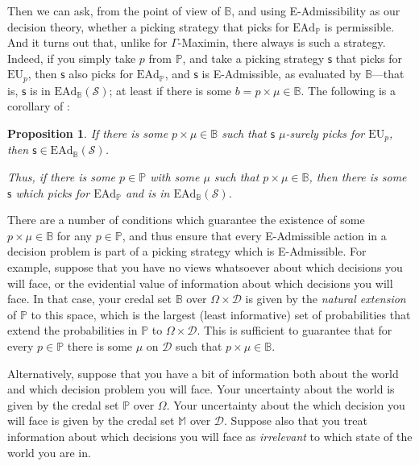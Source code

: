 \documentclass[a4paper]{article}
\newtheorem{proposition}[theorem]{Proposition}
\renewcommand\P{\mathbb{P}} %
\newcommand\EU{\mathrm{EU}}
\newcommand\EAd{\mathrm{EAd}}
\newcommand{\D}{\mathcal{D}}
\renewcommand\S{\mathcal{S}}
\newcommand\s{\mathsf{s}}
\newcommand{\IB}{\mathbb{B}}
\newcommand{\ID}{\mathbb{M}}
\newcommand{\IP}{\P}
\renewcommand{\color}[1]{}
\newenvironment{colored}[1]{\leavevmode\color{#1}}{}
\newcommand{\Strategies}{\S}
\newenvironment{CCM rewritten}
{\begingroup\color{blue}} %
{\endgroup}              %
\begin{document}
\begin{colored}{red}
	

 Then we can ask, from the point of view of $\IB$, and using E-Admissibility as our decision theory, whether a picking strategy that picks for $\EAd_\IP$ is permissible. And it turns out that, unlike for $\Gamma$-Maximin, there always is such a strategy. Indeed, if you simply take $p$ from $\IP$, and take a picking strategy $\s$ that picks for $\EU_p$, then $\s$ also picks for $\EAd_\IP$, and $\s$ is E-Admissible, as evaluated by $\IB$---that is, $\s$ is in $\EAd_\IB(\Strategies)$; at least if there is some $b=p\times\mu\in\IB$. The following is a corollary of :
 \begin{proposition}\label{thm:ead-existence[indep]}
 		If there is some $p\times \mu\in \IB$ such that $\s$ $\mu$-surely picks for $\EU_p$, then $\s\in\EAd_\IB(\Strategies)$. 
 		
 		Thus, if there is some $p\in\IP$ with some $\mu$ such that $p\times\mu\in\IB$, then there is some $\s$ which picks for $\EAd_\IP$ and is in  $\EAd_\IB(\Strategies)$. 
 \end{proposition}
\end{colored}
 
 There are a number of conditions which guarantee the existence of some $p\times\mu\in\IB$ for any $p\in\IP$, and thus ensure that every E-Admissible action in a decision problem is part of a picking strategy which is E-Admissible.
 For example, suppose that you have no views whatsoever about which decisions you will face,  or the evidential value of information about which decisions you will face. 
 In that case, your credal set $\IB$ over $\Omega\times\D$ is given by the \emph{natural extension} of $\IP$ to this space, which is the largest (least informative) set of probabilities that extend the probabilities in $\IP$ to $\Omega \times \D$. 
 This is sufficient to guarantee that for every $p\in\IP$ there is some $\mu$ on $\D$ such that $p\times\mu\in \IB$.
 

 
Alternatively, suppose that you have a bit of information both about the world and which decision problem you will face. Your uncertainty about the world is given by the credal set $\IP$ over $\Omega$. Your uncertainty about the which decision you will face is given by the credal set $\ID$ over $\D$. Suppose also that you treat information about which decisions you will face as \emph{irrelevant} to which state of the world you are in. 
\end{document}
